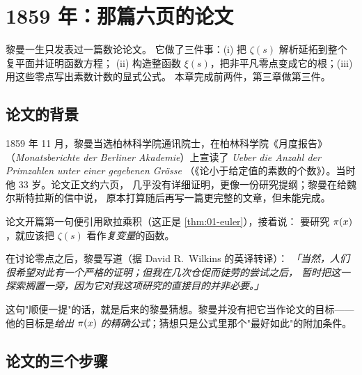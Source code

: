 \chapter{1859 年：那篇六页的论文}
\label{chap:1859}

\begin{keybox}[本章要点]
黎曼一生只发表过一篇数论论文\cite{riemann1859,claymanuscript}。
它做了三件事：(i) 把 $\zeta(s)$ 解析延拓到整个复平面并证明函数方程；
(ii) 构造整函数 $\xi(s)$，把非平凡零点变成它的根；(iii) 用这些零点写出素数计数的显式公式。
本章完成前两件，第三章做第三件。
\end{keybox}

\section{论文的背景}
\label{sec:02-history}

1859 年 11 月，黎曼当选柏林科学院通讯院士，在柏林科学院《月度报告》
（\emph{Monatsberichte der Berliner Akademie}）上宣读了
\textit{Ueber die Anzahl der Primzahlen unter einer gegebenen Gr\"osse}
（《论小于给定值的素数的个数》）。当时他 33 岁。论文正文约六页，
几乎没有详细证明，更像一份研究提纲；黎曼在给魏尔斯特拉斯的信中说，
原本打算随后再写一篇更完整的文章，但未能完成\cite{edwards2001}。

论文开篇第一句便引用欧拉乘积（这正是 \cref{thm:01-euler}），接着说：
要研究 $\pi(x)$，就应该把 $\zeta(s)$ 看作\emph{复变量}的函数。

\begin{histbox}[黎曼自己怎么说那个"猜想"]
在讨论零点之后，黎曼写道（据 David R.\ Wilkins 的英译转译）：
\emph{「当然，人们很希望对此有一个严格的证明；但我在几次仓促而徒劳的尝试之后，
暂时把这一探索搁置一旁，因为它对我这项研究的直接目的并非必要。」}
\par\smallskip
这句"顺便一提"的话，就是后来的黎曼猜想。黎曼并没有把它当作论文的目标——
他的目标是\emph{给出 $\pi(x)$ 的精确公式}；猜想只是公式里那个"最好如此"的附加条件。
\end{histbox}

\section{论文的三个步骤}
\label{sec:02-plan}

